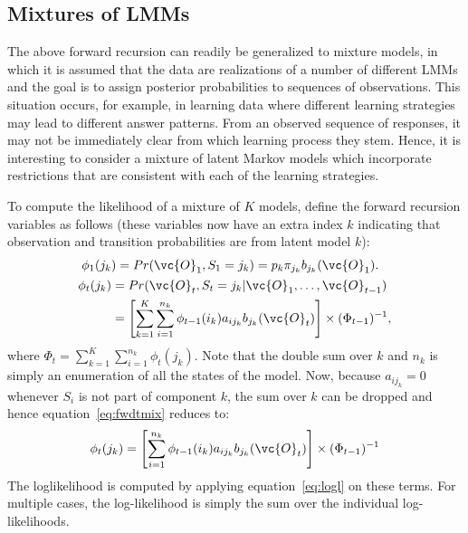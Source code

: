 
\subsection{Mixtures of LMMs}

The above forward recursion can readily be generalized to mixture 
models, in which it is assumed that the data are realizations of a 
number of different LMMs and the goal is to assign posterior 
probabilities to sequences of observations. This situation occurs, 
for example, in learning data where different learning strategies may 
lead to different answer patterns. From an observed sequence of 
responses, it may not be immediately clear from which learning 
process they stem. Hence, it is interesting to consider a mixture of 
latent Markov models which incorporate restrictions that are 
consistent with each of the learning strategies. 

To compute the likelihood of a mixture of $K$ models, define the 
forward recursion variables as follows (these variables now have an 
extra index $k$ indicating that observation and transition 
probabilities are from latent model $k$):
\begin{align}
\begin{split}
\phi_{1}(j_{k}) &=  Pr(\vc{O}_{1}, 
S_{1}=j_{k})=p_{k}\pi_{j_{k}}b_{j_{k}}(\vc{O}_{1}).
\end{split}\label{eq:fwd1mix} \\
\begin{split}
\phi_{t}(j_{k})   &=   Pr(\vc{O}_{t}, S_{t}=j_{k}|\vc{O}_{1}, \ldots, 
\vc{O}_{t-1}) \\
			&= \left[ \sum_{k=1}^{K} \sum_{i=1}^{n_{k}} \phi_{t-1}(i_{k}) 
			a_{ij_{k}}b_{j_{k}}(\vc{O}_{t}) \right] \times (\Phi_{t-1})^{-1},
\end{split}\label{eq:fwdtmix} 
\end{align}
where $\Phi_{t} = \sum_{k=1}^{K}\sum_{i=1}^{n_{k}} \phi_{t}(j_{k})$.
Note that the double sum over $k$ and $n_{k}$ is simply an enumeration
of all the states of the model.  Now, because $a_{ij_{k}}=0$ whenever
$S_{i}$ is not part of component $k$, the sum over $k$ can be dropped
and hence equation~\ref{eq:fwdtmix} reduces to:
\begin{equation}
	\phi_{t}(j_{k}) = \left[ \sum_{i=1}^{n_{k}} \phi_{t-1}(i_{k}) 
			a_{ij_{k}}b_{j_{k}}(\vc{O}_{t}) \right] \times (\Phi_{t-1})^{-1}
\end{equation}
The loglikelihood is computed by applying equation~\ref{eq:logl} on
these terms.  For multiple cases, the log-likelihood is simply the sum
over the individual log-likelihoods. 


